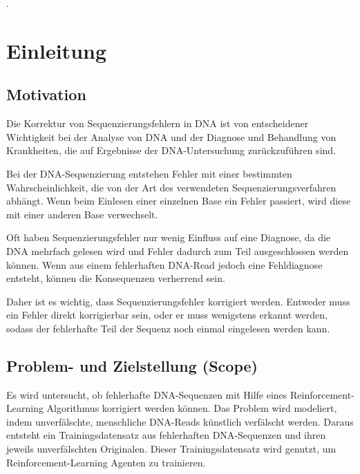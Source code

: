 \documentclass[oneside,bibliography=totocnumbered,BCOR=5mm]{scrbook}%
\theoremstyle{definition}
\theoremstyle{definition}
\theoremstyle{definition}
\theoremstyle{definition}
\theoremstyle{definition}
\theoremstyle{definition}
\begin{document}
\clearpage

\tableofcontents  



 \listoffigures
 

 \listoftables
 


 \lstlistoflistings

.

\newpage



\chapter{Einleitung}
\section{Motivation}
Die Korrektur von Sequenzierungsfehlern in DNA ist von entscheidener Wichtigkeit bei der Analyse von DNA
und der Diagnose und Behandlung von Krankheiten, die auf Ergebnisse der DNA-Untersuchung zurückzuführen sind.


Bei der DNA-Sequenzierung entstehen Fehler mit einer bestimmten Wahrscheinlichkeit, die von der Art des verwendeten Sequenzierungsverfahren abhängt.
Wenn beim Einlesen einer einzelnen Base ein Fehler passiert, wird diese mit einer anderen Base verwechselt.


Oft haben Sequenzierungsfehler nur wenig Einfluss auf eine Diagnose, da die DNA mehrfach gelesen wird und Fehler dadurch
zum Teil ausgeschlossen werden können.
Wenn aus einem fehlerhaften DNA-Read jedoch eine Fehldiagnose entsteht, können die Konsequenzen verherrend sein. 


Daher ist es wichtig, dass Sequenzierungsfehler korrigiert werden. 
Entweder muss ein Fehler direkt korrigierbar sein, oder er muss wenigstens erkannt werden, 
sodass der fehlerhafte Teil der Sequenz noch einmal eingelesen werden kann. 


\section{Problem- und Zielstellung (Scope)}
Es wird untersucht, ob fehlerhafte DNA-Sequenzen mit Hilfe eines Reinforcement-Learning Algorithmus korrigiert werden können. 
Das Problem wird modeliert, indem unverfälschte, menschliche DNA-Reads künstlich verfälscht werden. 
Daraus entsteht ein Trainingsdatensatz aus fehlerhaften DNA-Sequenzen und ihren jeweils unverfälschten Originalen.
Dieser Trainingsdatensatz wird genutzt, um Reinforcement-Learning Agenten zu trainieren.
\end{document}
